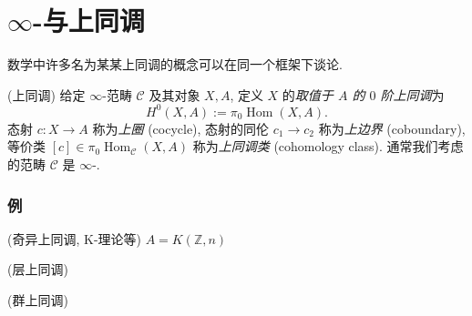 \chapter{$\infty$-\topos{}与上同调}

数学中许多名为某某上同调的概念可以在同一个框架下谈论.

\begin{definition}
	{(上同调)}
	给定 $\infty$-范畴 $\mathcal C$ 及其对象 $X,A$, 定义 $X$ 的\emph{取值于 $A$ 的 $0$ 阶上同调}为
	$$
	H^0(X,A):=\pi_0\operatorname{Hom}(X,A).
	$$
	态射 $c\colon X\to A$ 称为\emph{上圈} (cocycle),
	态射的同伦 $c_1\to c_2$ 称为\emph{上边界} (coboundary),
	等价类 $[c]\in\pi_0\operatorname{Hom}_{\mathcal C}(X,A)$ 称为\emph{上同调类} (cohomology class). 通常我们考虑的范畴 $\mathcal C$ 是 $\infty$-\topos{}.
\end{definition}

\subsection{例}

\begin{example}
	{(奇异上同调, K-理论等)}
	$A = K(\mathbb{Z},n)$
\end{example}

\begin{example}
	{(层上同调)}
\end{example}

\begin{example}
	{(群上同调)}
\end{example}

